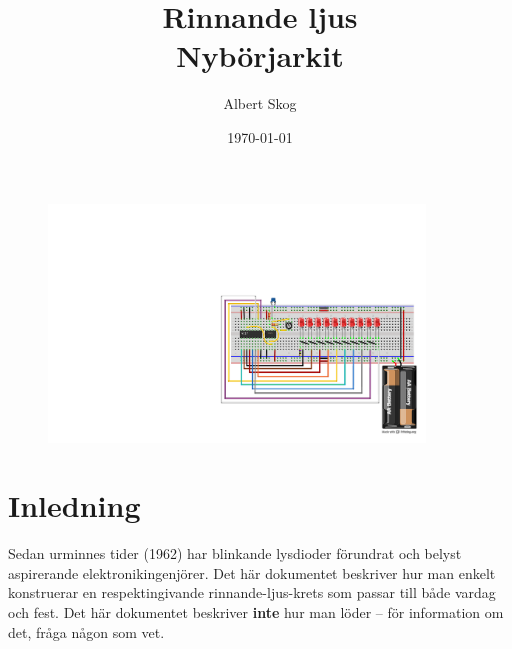 \documentclass{article}
\begin{document}
\begin{titlepage}
\title{\textbf{Rinnande ljus} \\
\Large{Nybörjarkit}}
\author{Albert Skog}
\date{\today}
\maketitle
\thispagestyle{empty}
\begin{center}

\vspace{200pt}

\begin{figure}[h]
\begin{center}
\includegraphics[width=10cm]{fig/rinnande_ljus_bb.pdf}
\end{center}
\end{figure}

\end{center}

\end{titlepage}

\pagestyle{empty}

\tableofcontents
\clearpage
\pagestyle{fancy}
\setcounter{page}{1}
\section{Inledning}
Sedan urminnes tider (1962) har blinkande lysdioder förundrat och belyst aspirerande elektronikingenjörer. Det här dokumentet beskriver hur man enkelt konstruerar en respektingivande rinnande-ljus-krets som passar till både vardag och fest. Det här dokumentet beskriver \textbf{inte} hur man löder -- för information om det, fråga någon som vet.
\end{document}
